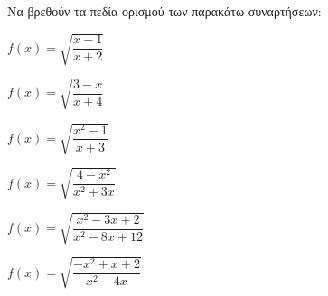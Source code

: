 Να βρεθούν τα πεδία ορισμού των παρακάτω συναρτήσεων:
\begin{alist}
\begin{multicols}{2}
\item $ f(x)=\sqrt{\dfrac{x-1}{x+2}} $
\item $ f(x)=\sqrt{\dfrac{3-x}{x+4}} $
\item $ f(x)=\sqrt{\dfrac{x^2-1}{x+3}} $
\item $ f(x)=\sqrt{\dfrac{4-x^2}{x^2+3x}} $
\item $ f(x)=\sqrt{\dfrac{x^2-3x+2}{x^2-8x+12}} $
\item $ f(x)=\sqrt{\dfrac{-x^2+x+2}{x^2-4x}} $
\end{multicols}
\end{alist}
